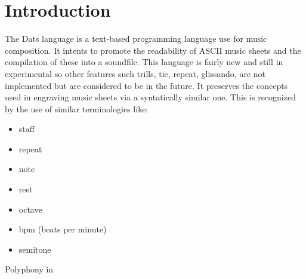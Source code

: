 \section{Introduction}
\renewcommand\frelo{\S\thesubsection}
\setcounter{page}{4}
\np The Dats language is a text-based programming language use for music composition.
It intents to promote the readability of ASCII music sheets and the compilation of these into
 a soundfile.
This language is fairly new and still in experimental so other features such trills, tie,
repeat, glissando, are not implemented but are considered to be in the future. It preserves the
concepts used in engraving music sheets via a syntatically similar one. This is
recognized by the use of similar terminologies like:

\begin{multicols}{2}
\begin{itemize}
\renewcommand{\labelitemi}{--}
\item staff
\item repeat
\item note
\item rest
\item octave
\item bpm (beats per minute)
\item semitone
\end{itemize}
\end{multicols}

\np Polyphony in
